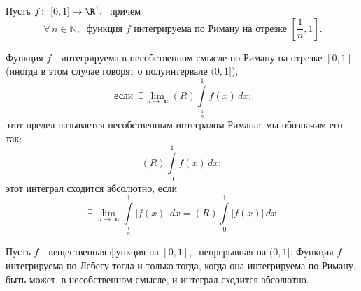 \documentclass[a4paper]{article}
\newcommand{\nsb}{n\rightarrow \infty} %
\newcommand{\lin} {\lim \limits_{\nsb} }
\newcommand{\fd} { f(x)\, dx}
\newcommand{\mro} {\R^1}
\begin{document}
\begin{df}
Пусть $f\colon \ [0,1] \rightarrow \mro,\ $ причем
$$\ \forall \,
n\in \mathbb{N},\ \mbox{ функция $f$ интегрируема по Риману на
отрезке } \left[\frac{1}{n}, 1\right].$$

Функция $f$ - интегрируема в несобственном смысле но Риману на
отрезке $[0, 1]$ (иногда в этом случае говорят о полуинтервале
$(0, 1]$),
$$\mbox{ если } \ \exists  \lin (R) \int \limits_{\frac{1}{n}}^1 \fd;$$
этот предел называется несобственным интегралом Римана;\  мы
обозначим его так:
$$(R) \int \limits_0^1 \fd; $$
этот интеграл сходится абсолютно, если $$\exists \  \lin \int
\limits_{\frac{1}{n}}^1 |f(x)| \, dx = (R) \int \limits_0^1 |f(x)|
\, dx$$
\end{df}
\begin{theorem}
Пусть $f$ - вещественная функция на $[0, 1],\ $ непрерывная на
$(0,1].$ Функция $f$ интегрируема по Лебегу тогда и только тогда,
когда она интегрируема по Риману, быть может, в несобственном
смысле, и интеграл сходится абсолютно.
\end{theorem}
\end{document}
